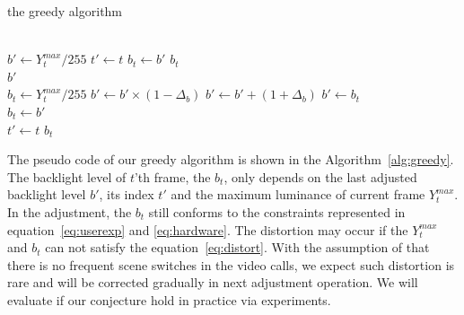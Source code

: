 
\begin{algorithm}
  \caption{the greedy algorithm}
  \label{alg:greedy}
  \begin{algorithmic}[1]
    \\
      \State $b' \gets Y_{t}^{max} / 255$
      \State $t' \gets t$
      \State $b_t \gets b'$
      \Return $b_t$
    \EndIf
      \\
      \Return $b'$
    \EndIf
    \\

    \State $b_{t} \gets Y_{t}^{max} / 255$
      \State $b' \gets b' \times (1 - \Delta_{b})$
      \State $b' \gets b' + (1 + \Delta_{b})$
    \Else
      \State $b' \gets b_t$
    \EndIf
    \\
    \State $b_{t} \gets b'$\\
    \State $t' \gets t$
    \Return $b_{t}$
  \end{algorithmic}
  
\end{algorithm}

The pseudo code of 
our greedy algorithm is shown in the
Algorithm~\ref{alg:greedy}. The backlight level of $t$'th frame, the
$b_t$, only depends on the last adjusted backlight level $b'$, its
index $t'$ and the maximum luminance of current frame $Y_t^{max}$. In
the adjustment, the $b_t$ still conforms to the constraints represented
in equation~\ref{eq:userexp} and \ref{eq:hardware}. The distortion may
occur if the $Y_t^{max}$ and $b_t$ can not satisfy the
equation~\ref{eq:distort}. With the assumption of that there is no
frequent scene switches in the video calls, we expect such distortion
is rare and will be
corrected gradually in next adjustment operation. We will evaluate if
our conjecture hold in practice via experiments. 







